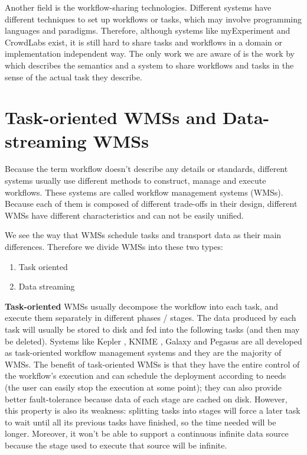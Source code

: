 Another field is the workflow-sharing technologies. Different systems have different techniques to set up workflows or tasks, which may involve programming languages and paradigms. Therefore, although systems like myExperiment \cite{de2008design} and CrowdLabs \cite{Mates2011} exist, it is still hard to share tasks and workflows in a domain or implementation independent way. The only work we are aware of is the work by \citeauthor{GARIJO2017271} \cite{GARIJO2017271} which describes the semantics and a system to share workflows and tasks in the sense of the actual task they describe. 

\section{Task-oriented WMSs and Data-streaming WMSs}
Because the term workflow doesn't describe any details or standards, different systems usually use different methods to construct, manage and execute workflows. These systems are called workflow management systems (WMSs). Because each of them is composed of different trade-offs in their design, different WMSs have different characteristics and can not be easily unified.

We see the way that WMSs schedule tasks and transport data as their main differences. Therefore we divide WMSs into these two types:
\begin{enumerate}
	\item Task oriented
	\item Data streaming
\end{enumerate}

\textbf{Task-oriented} WMSs usually decompose the workflow into each task, and execute them separately in different phases / stages. The data produced by each task will usually be stored to disk and fed into the following tasks (and then may be deleted). Systems like Kepler \cite{ludascher2006scientific}, KNIME \cite{Berthold:2009:KKI:1656274.1656280}, Galaxy \cite{blankenberg2010galaxy} and Pegasus \cite{deelman2015pegasus} are all developed as task-oriented workflow management systems and they are the majority of WMSs. The benefit of task-oriented WMSs is that they have the entire control of the workflow's execution and can schedule the deployment according to needs (\ie the user can easily stop the execution at some point); they can also provide better fault-tolerance because data of each stage are cached on disk. However, this property is also its weakness: splitting tasks into stages will force a later task to wait until all its previous tasks have finished, so the time needed will be longer. Moreover, it won't be able to support a continuous infinite data source because the stage used to execute that source will be infinite.

